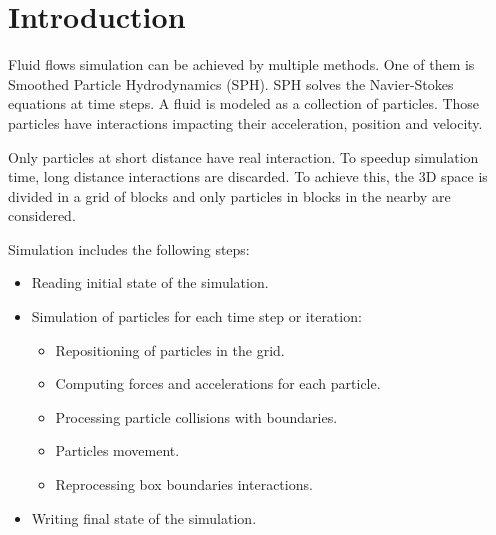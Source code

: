 \section{Introduction}

Fluid flows simulation can be achieved by multiple methods. One of them is
Smoothed Particle Hydrodynamics (SPH). SPH solves the Navier-Stokes equations
at time steps. A fluid is modeled as a collection of particles. Those
particles have interactions impacting their acceleration, position and velocity.

Only particles at short distance have real interaction. To speedup simulation
time, long distance interactions are discarded. To achieve this, the 3D space
is divided in a grid of blocks and only particles in blocks in the nearby are
considered.

Simulation includes the following steps:
\begin{itemize}
  \item Reading initial state of the simulation.
  \item Simulation of particles for each time step or iteration:
    \begin{itemize}
      \item Repositioning of particles in the grid.
      \item Computing forces and accelerations for each particle.
      \item Processing particle collisions with boundaries.
      \item Particles movement.
      \item Reprocessing box boundaries interactions.
    \end{itemize}
  \item Writing final state of the simulation.
\end{itemize}
